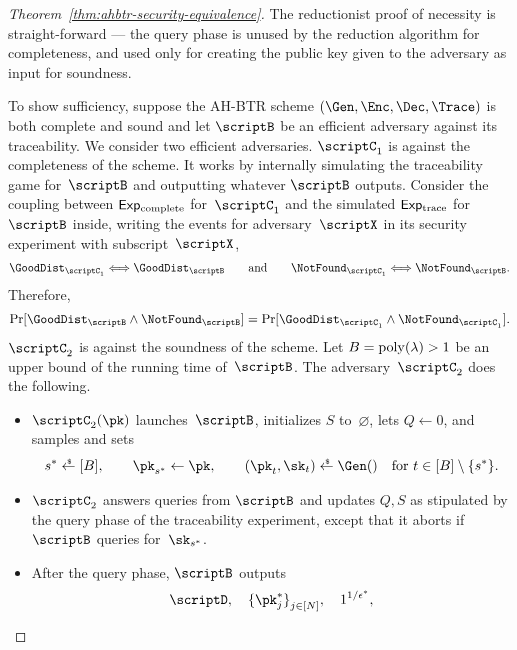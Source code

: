 \begin{proof}
[%
Theorem~\ref{thm:ahbtr-security-equivalence}]
The reductionist proof of necessity is straight-forward ---
the query phase is
unused by the reduction algorithm for completeness, and
used only for creating the public key given to the adversary as input
for soundness.

To show sufficiency, suppose the AH-BTR scheme $(\Gen,\Enc,\Dec,\Trace)$ is both com\-plete and sound and let $\scriptB$ be an efficient adversary against its traceability.
We consider two efficient adversaries.
$\scriptC_1$ is against the completeness of the scheme.
It works by internally simulating the traceability game for~$\scriptB$ and outputting whatever $\scriptB$ outputs.
Consider the coupling between $\ExpComplete$ for~$\scriptC_1$
and the simulated $\ExpTrace$ for~$\scriptB$ inside,
writing the events for adversary~$\scriptX$ in its security experiment with subscript~$\scriptX$,
\begin{align*}
\GoodDist_{\scriptC_1}
\Longleftrightarrow
\GoodDist_\scriptB
\qquad\textup{and}\qquad
\NotFound_{\scriptC_1}
\Longleftrightarrow
\NotFound_\scriptB.
\end{align*}
Therefore,
\begin{align*}
\Pr[\GoodDist_\scriptB\wedge\NotFound_\scriptB]
=
\Pr[\GoodDist_{\scriptC_1}\wedge\NotFound_{\scriptC_1}].
\end{align*}
$\scriptC_2$ is against the soundness of the scheme.
Let ${B=\operatorname{poly}(\lambda)>1}$ be an upper bound of the running time of~$\scriptB$.
The adversary~$\scriptC_2$ does the following.
\begin{itemize}
\item $\scriptC_2(\pk)$ launches~$\scriptB$,
initializes $S$ to~$\varnothing$,
lets ${Q\gets 0}$, and
samples and sets
\begin{align*}
s^\ast\draws[B],\qquad
\pk_{s^\ast}\gets\pk,\qquad
(\pk_t,\sk_t)\draws\Gen()\quad\textup{for }t\in{[B]\setminus{\{s^\ast\}}}.
\end{align*}
\item $\scriptC_2$ answers queries from $\scriptB$ and updates $Q,S$ as stipulated by the query phase of the traceability experiment, except that it aborts if $\scriptB$ queries for~$\sk_{s^\ast}$.
\item After the query phase, $\scriptB$ outputs
\begin{align*}
\scriptD,\quad
\{\pk_j^\ast\}_{j\in[N]}^\sphantom,\quad
1^{1/\epsilon^\ast},
\end{align*}

\end{itemize}
\end{proof}
